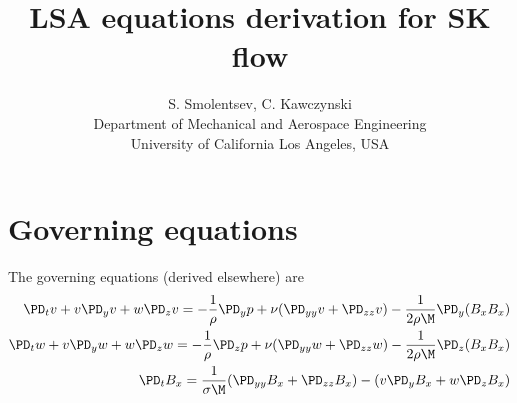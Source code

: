 \documentclass[11pt]{article}
\begin{document}
\doublespacing
\title{LSA equations derivation for SK flow}
\author{S. Smolentsev, C. Kawczynski \\
Department of Mechanical and Aerospace Engineering \\
University of California Los Angeles, USA\\
}
\maketitle

\section{Governing equations}

The governing equations (derived elsewhere) are
\begin{equation}\begin{aligned}
\PD_t v+ v\PD_y v + w\PD_z v = -\frac{1}{\rho}\PD_y p+ \nu (\PD_{yy} v+\PD_{zz} v) - \frac{1}{2 \rho \M} \PD_y (B_x B_x) \\
\PD_t w+ v\PD_y w + w\PD_z w = -\frac{1}{\rho}\PD_z p+ \nu (\PD_{yy} w+\PD_{zz} w) - \frac{1}{2 \rho \M} \PD_z (B_x B_x) \\
\PD_t B_x = \frac{1}{\sigma \M} (\PD_{yy} B_x+\PD_{zz} B_x) - (v\PD_y B_x+w\PD_z B_x) \\
\end{aligned} \end{equation}
\end{document}
